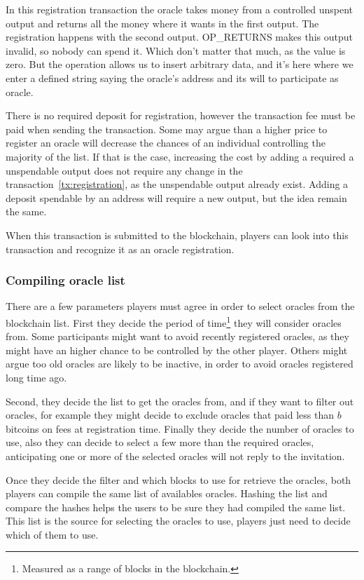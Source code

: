 In this registration transaction the oracle takes money from a controlled
  unspent output and returns all the money where it wants in the first
  output.
The registration happens with the second output. OP\_RETURNS makes this output
  invalid, so nobody can spend it.
Which don't matter that much, as the value is zero. But the operation allows
  us to insert arbitrary data, and it's here where we enter a defined string
  saying the oracle's address and its will to participate as oracle.

There is no required deposit for registration, however the transaction fee must
  be paid when sending the transaction.
Some may argue than a higher price to register an oracle will decrease the
  chances of an individual controlling the majority of the list.
If that is the case, increasing the cost by adding a required a unspendable
output does not require any change in the transaction~\ref{tx:registration},
  as the unspendable output already exist.
Adding a deposit spendable by an address will require a new output, but the
  idea remain the same.

When this transaction is submitted to the blockchain, players can look into
  this transaction and recognize it as an oracle registration.

\subsubsection{Compiling oracle list}

There are a few parameters players must agree in order to select oracles from
  the blockchain list.
First they decide the period of time\footnote{Measured as a range of blocks in
  the blockchain.} they will consider oracles from.
Some participants might want to avoid recently registered oracles, as they might
  have an higher chance to be controlled by the other player.
Others might argue too old oracles are likely to be inactive, in order to avoid
  oracles registered long time ago.

Second, they decide the list to get the oracles from, and if they want to filter
  out oracles, for example they might decide to exclude oracles that paid less
  than $b$ bitcoins on fees at registration time.
Finally they decide the number of oracles to use, also they can decide to
  select a few more than the required oracles, anticipating one or more of
  the selected oracles will not reply to the invitation.

Once they decide the filter and which blocks to use for retrieve the oracles,
  both players can compile the same list of availables oracles.
Hashing the list and compare the hashes helps the users to be sure they had
  compiled the same list.
This list is the source for selecting the oracles to use, players just need to
  decide which of them to use.

